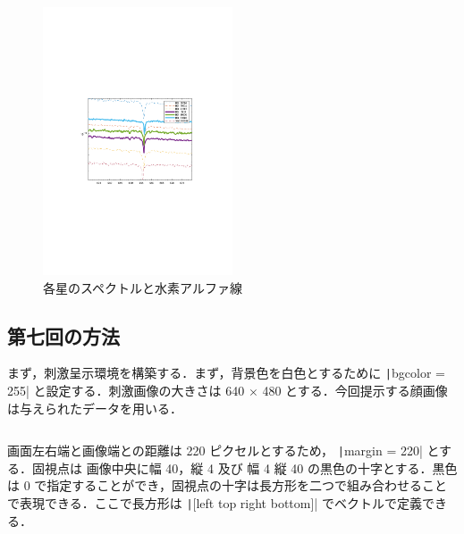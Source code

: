 \documentclass[dvipdfmx, titlepage, t]{jsarticle}
\begin{document}
    \begin{figure}[H]
        \centering
        \includegraphics[width=0.5\textwidth]{figure/stellar2.pdf}
        \caption{各星のスペクトルと水素アルファ線}
        \label{fig:exp3_6_spectra2}
    \end{figure}

\subsection{第七回の方法}
    まず，刺激呈示環境を構築する．まず，背景色を白色とするために \texttt|bgcolor = 255| と設定する．刺激画像の大きさは 640 $\times$ 480 とする．今回提示する顔画像は与えられたデータを用いる．

    \begin{program}[H]
    \inputminted[linenos, firstline=5, lastline=12, frame=lines, fontsize=\small]{matlab}{code/Exp3_7_Matlab.m}
    \end{program}

    画面左右端と画像端との距離は 220 ピクセルとするため， \texttt|margin = 220| とする．固視点は 画像中央に幅 40，縦 4 及び 幅 4 縦 40 の黒色の十字とする．黒色は 0 で指定することができ，固視点の十字は長方形を二つで組み合わせることで表現できる．ここで長方形は \texttt|[left top right bottom]| でベクトルで定義できる．
    \begin{program}[H]
        \inputminted[linenos, firstline=32, lastline=36, frame=lines, fontsize=\small]{matlab}{code/Exp3_7_Matlab.m}      
        \caption{固視点の表示}
        \label{lst:exp3_7_eye}
    \end{program}
\end{document}
